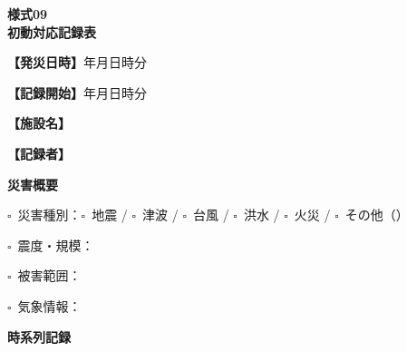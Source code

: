 \documentclass[a4paper,12pt]{jarticle}
\newcommand{\checkbox}{$\square$\ }
\newcommand{\underlinespace}[1]{\underline{\hspace{#1}}}
\begin{document}
\begin{center}
{\Large\textbf{様式09}}\\
\vspace{3mm}
{\Large\textbf{初動対応記録表}}
\end{center}
\vspace{3mm}

\noindent
\textbf{【発災日時】}\underlinespace{1.5cm}年\underlinespace{1cm}月\underlinespace{1cm}日\underlinespace{1cm}時\underlinespace{1cm}分

\vspace{2mm}

\noindent
\textbf{【記録開始】}\underlinespace{1.5cm}年\underlinespace{1cm}月\underlinespace{1cm}日\underlinespace{1cm}時\underlinespace{1cm}分

\vspace{2mm}

\noindent
\textbf{【施設名】} \underlinespace{8cm}

\vspace{2mm}

\noindent
\textbf{【記録者】} \underlinespace{8cm}

\vspace{5mm}

\begin{center}
\textbf{\large 災害概要}
\end{center}

\vspace{2mm}

\noindent
\checkbox 災害種別：\checkbox 地震 / \checkbox 津波 / \checkbox 台風 / \checkbox 洪水 / \checkbox 火災 / \checkbox その他（\underlinespace{3cm}）

\vspace{2mm}

\noindent
\checkbox 震度・規模：\underlinespace{10cm}

\vspace{2mm}

\noindent
\checkbox 被害範囲：\underlinespace{10cm}

\vspace{2mm}

\noindent
\checkbox 気象情報：\underlinespace{10cm}

\vspace{5mm}

\begin{center}
\textbf{\large 時系列記録}
\end{center}
\end{document}
